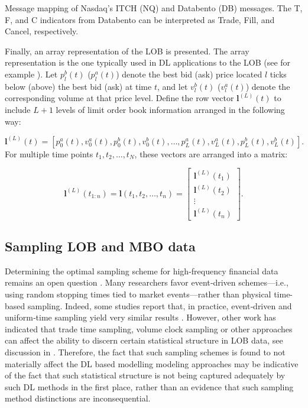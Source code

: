 \documentclass[10pt,a4paper,oneside]{article}
\providecommand{\DIFaddtex}[1]{{\protect\color{blue} \sf #1}} %
\providecommand{\DIFdeltex}[1]{{\protect\color{red} \scriptsize #1}} %
\providecommand{\DIFaddbegin}{} %
\providecommand{\DIFaddend}{} %
\providecommand{\DIFdelbegin}{} %
\providecommand{\DIFdelend}{} %
\providecommand{\DIFdelFL}[1]{\DIFdel{#1}} %
\providecommand{\DIFaddbeginFL}{} %
\providecommand{\DIFaddendFL}{} %
\providecommand{\DIFdelbeginFL}{} %
\providecommand{\DIFdelendFL}{} %
\providecommand{\DIFadd}[1]{\texorpdfstring{\DIFaddtex{#1}}{#1}} %
\providecommand{\DIFdel}[1]{\texorpdfstring{\DIFdeltex{#1}}{}} %
\newcommand{\DIFscaledelfig}{0.5}
\newlength{\DIFdelgraphicswidth} %
\newlength{\DIFdelgraphicsheight} %
\newcommand{\DIFaddincludegraphics}[2][]{{\color{blue}\fbox{\DIFOincludegraphics[#1]{#2}}}} %
\newcommand{\DIFdelincludegraphics}[2][]{%
\sbox{\DIFdelgraphicsbox}{\DIFOincludegraphics[#1]{#2}}%
\settoboxwidth{\DIFdelgraphicswidth}{\DIFdelgraphicsbox} %
\settoboxtotalheight{\DIFdelgraphicsheight}{\DIFdelgraphicsbox} %
\scalebox{\DIFscaledelfig}{%
\parbox[b]{\DIFdelgraphicswidth}{\usebox{\DIFdelgraphicsbox}\\[-\baselineskip] \rule{\DIFdelgraphicswidth}{0em}}\llap{\resizebox{\DIFdelgraphicswidth}{\DIFdelgraphicsheight}{%
\setlength{\unitlength}{\DIFdelgraphicswidth}%
\begin{picture}(1,1)%
\thicklines\linethickness{2pt} %
{\color[rgb]{1,0,0}\put(0,0){\framebox(1,1){}}}%
{\color[rgb]{1,0,0}\put(0,0){\line( 1,1){1}}}%
{\color[rgb]{1,0,0}\put(0,1){\line(1,-1){1}}}%
\end{picture}%
}\hspace*{3pt}}} %
} %
\DeclareRobustCommand{\DIFaddbegin}{\DIFOaddbegin \let\includegraphics\DIFaddincludegraphics} %
\DeclareRobustCommand{\DIFaddend}{\DIFOaddend \let\includegraphics\DIFOincludegraphics} %
\DeclareRobustCommand{\DIFdelbegin}{\DIFOdelbegin \let\includegraphics\DIFdelincludegraphics} %
\DeclareRobustCommand{\DIFdelend}{\DIFOaddend \let\includegraphics\DIFOincludegraphics} %
\DeclareRobustCommand{\DIFaddbeginFL}{\DIFOaddbeginFL \let\includegraphics\DIFaddincludegraphics} %
\DeclareRobustCommand{\DIFaddendFL}{\DIFOaddendFL \let\includegraphics\DIFOincludegraphics} %
\DeclareRobustCommand{\DIFdelbeginFL}{\DIFOdelbeginFL \let\includegraphics\DIFdelincludegraphics} %
\DeclareRobustCommand{\DIFdelendFL}{\DIFOaddendFL \let\includegraphics\DIFOincludegraphics} %
\begin{document}
\begin{table}[ht!]
\begin{tabular}{|l|l|l|l|}
    \end{tabular}
    \DIFdelbeginFL %
{%
\DIFdelFL{Message mapping of Nasdaq's ITCH (NQ) and Databento (DB) messages. The T, F, and C indicators from Databento can be interpreted as Trade, Fill, and Cancel, respectively.}}
\DIFdelendFL \DIFaddbeginFL 

    
\DIFaddendFL \end{table}


Finally, an array representation of the LOB is presented. The array representation is the one typically used in DL applications to the LOB (see for example \cite{kolm2024improving, Zhang_2019}). Let $p_l^b(t)$ ($p_l^a(t)$) denote the best bid (ask) price located $l$ ticks below (above) the best bid (ask) at time $t$, and let $v_l^b(t)$ ($v_l^a(t)$) denote the corresponding volume at that price level. Define the row vector $\mathbf{l}^{(L)}(t)$ to include $L + 1$ levels of limit order book information arranged in the following way:

$$
    \mathbf{l}^{(L)}(t) = [p^a_0(t), v^a_0(t), p^b_0(t), v^b_0(t), \dots, p^a_L(t), v^a_L(t), p^b_L(t), v^b_L(t)].
$$
For multiple time points $t_1, t_2, \dots, t_N$, these vectors are arranged into a matrix:

$$
    \mathbf{l}^{(L)}(t_{1:n})=\mathbf{l}(t_1, t_2, \dots, t_n) = \begin{bmatrix}
        \mathbf{l}^{(L)}(t_1) \\
        \mathbf{l}^{(L)}(t_2) \\
        \vdots                \\
        \mathbf{l}^{(L)}(t_n)
    \end{bmatrix}.
$$

\subsection{Sampling LOB and MBO data}
\label{SubSect:SampLOB}
Determining the optimal sampling scheme for high-frequency financial data remains an open question \cite{dutta2023review}.  Many researchers favor event‐driven schemes—i.e., using random stopping times tied to market events—rather than physical time-based sampling.  Indeed, some studies report that, in practice, event‐driven and uniform‐time sampling yield very similar results \cite{easley2021microstructure}. However, other work has indicated that trade time sampling, volume clock sampling or other approaches can affect the ability to discern certain statistical structure in LOB data, see discussion in \cite{koukorinis4959155memory}. Therefore, the fact that such sampling schemes is found to not materially affect the DL based \DIFdelbegin \DIFdel{modelling }\DIFdelend \DIFaddbegin \DIFadd{modeling }\DIFaddend approaches may be indicative of the fact that such statistical structure is not being captured adequately by such DL methods in the first place, rather than an evidence that such sampling method distinctions are inconsequential.
\end{document}
